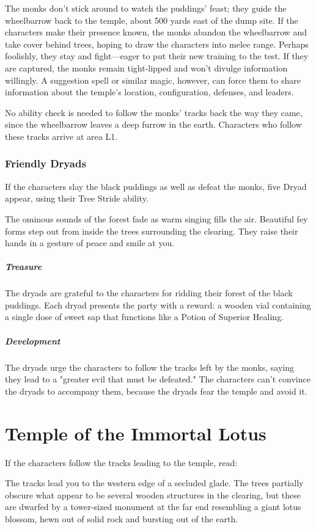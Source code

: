 \documentclass[10pt,a4paper,twoside,bg=print,twocolumn,openany,nodeprecatedcode]{dndbook}
\begin{document}
The monks don't stick around to watch the puddings' feast; they guide the wheelbarrow back to the temple, about 500 yards east of the dump site. If the characters make their presence known, the monks abandon the wheelbarrow and take cover behind trees, hoping to draw the characters into melee range. Perhaps foolishly, they stay and fight—eager to put their new training to the test. If they are captured, the monks remain tight-lipped and won't divulge information willingly. A suggestion spell or similar magic, however, can force them to share information about the temple's location, configuration, defenses, and leaders.

No ability check is needed to follow the monks' tracks back the way they came, since the wheelbarrow leaves a deep furrow in the earth. Characters who follow these tracks arrive at area L1.

\subsubsection{Friendly Dryads}
If the characters slay the black puddings as well as defeat the monks, five Dryad appear, using their Tree Stride ability.

\begin{DndReadAloud}{}
The ominous sounds of the forest fade as warm singing fills the air. Beautiful fey forms step out from inside the trees surrounding the clearing. They raise their hands in a gesture of peace and smile at you.

\end{DndReadAloud}

\subparagraph{Treasure}
The dryads are grateful to the characters for ridding their forest of the black puddings. Each dryad presents the party with a reward: a wooden vial containing a single dose of sweet sap that functions like a Potion of Superior Healing.

\subparagraph{Development}
The dryads urge the characters to follow the tracks left by the monks, saying they lead to a "greater evil that must be defeated." The characters can't convince the dryads to accompany them, because the dryads fear the temple and avoid it.

\section{Temple of the Immortal Lotus}
If the characters follow the tracks leading to the temple, read:

\begin{DndReadAloud}{}
The tracks lead you to the western edge of a secluded glade. The trees partially obscure what appear to be several wooden structures in the clearing, but these are dwarfed by a tower-sized monument at the far end resembling a giant lotus blossom, hewn out of solid rock and bursting out of the earth.

\end{DndReadAloud}
\end{document}
